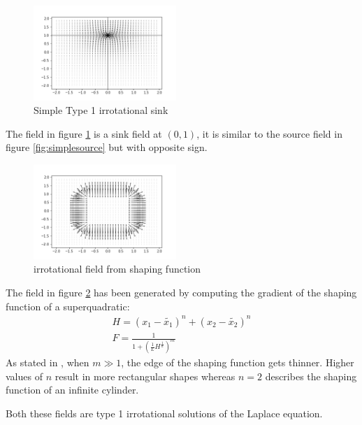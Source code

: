 \begin{figure}[h!]
    \centering
    \includegraphics[width=0.48\textwidth]{Images/simplesink01.png}
    \caption{Simple Type 1 irrotational sink}
    \label{fig:simplesink}
\end{figure}
The field in figure \ref{fig:simplesink} is a sink field at $(0,1)$, it is similar to the source field in figure \ref{fig:simplesource} but with opposite sign.

\begin{figure}[h!]
    \centering
    \includegraphics[width=0.48\textwidth]{Images/irrotafromshaping.png}
    \caption{irrotational field from shaping function}
    \label{fig:irrotafromshaping}
\end{figure}
The field in figure \ref{fig:irrotafromshaping} has been generated by computing the gradient of the shaping function of a superquadratic: 
\begin{align}
    H=(x_1-\tilde{{x}_{1}})^n+(x_2-\tilde{{x}_{2}})^n \\
    F=\frac{1}{1+(\frac{1}{L}H^{\frac{1}{n}})^m}
\end{align}
As stated in \cite{mcinnes2003velocity}, when $m\gg1$, the edge of the shaping function gets thinner. Higher values of $n$ result in more rectangular shapes whereas $n=2$ describes the shaping function of an infinite cylinder.

Both these fields are type 1 irrotational solutions of the Laplace equation.

